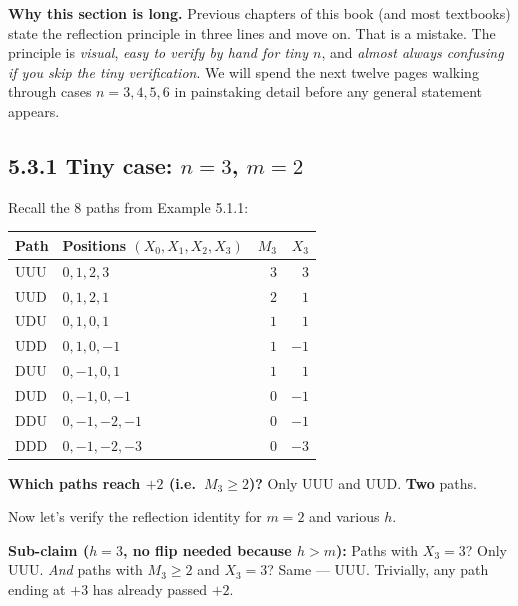 \documentclass[
  10pt,
  twoside]{book}
\newcounter{none} %
\begin{document}
\textbf{Why this section is long.} Previous chapters of this book (and
most textbooks) state the reflection principle in three lines and move
on. That is a mistake. The principle is \emph{visual}, \emph{easy to
verify by hand for tiny \(n\)}, and \emph{almost always confusing if you
skip the tiny verification}. We will spend the next twelve pages walking
through cases \(n = 3, 4, 5, 6\) in painstaking detail before any
general statement appears.

\subsection{\texorpdfstring{5.3.1 Tiny case: \(n = 3\),
\(m = 2\)}{5.3.1 Tiny case: n = 3, m = 2}}\label{tiny-case-n-3-m-2}

Recall the 8 paths from Example 5.1.1:

{\def\LTcaptype{none} %
\begin{table}[H]
\centering
\begin{tabular}{|l|l|r|r|}
\toprule
Path & Positions \((X_0, X_1, X_2, X_3)\) & \(M_3\) & \(X_3\) \\
\midrule



UUU & \(0, 1, 2, 3\) & \(3\) & \(3\) \\
UUD & \(0, 1, 2, 1\) & \(2\) & \(1\) \\
UDU & \(0, 1, 0, 1\) & \(1\) & \(1\) \\
UDD & \(0, 1, 0, -1\) & \(1\) & \(-1\) \\
DUU & \(0, -1, 0, 1\) & \(1\) & \(1\) \\
DUD & \(0, -1, 0, -1\) & \(0\) & \(-1\) \\
DDU & \(0, -1, -2, -1\) & \(0\) & \(-1\) \\
DDD & \(0, -1, -2, -3\) & \(0\) & \(-3\) \\
\bottomrule
\end{tabular}
\end{table}
}

\textbf{Which paths reach \(+2\) (i.e.~\(M_3 \ge 2\))?} Only UUU and
UUD. \textbf{Two} paths.

Now let's verify the reflection identity for \(m = 2\) and various
\(h\).

\textbf{Sub-claim (\(h = 3\), no flip needed because \(h > m\)):} Paths
with \(X_3 = 3\)? Only UUU. \emph{And} paths with \(M_3 \ge 2\) and
\(X_3 = 3\)? Same --- UUU. Trivially, any path ending at \(+3\) has
already passed \(+2\).
\end{document}
